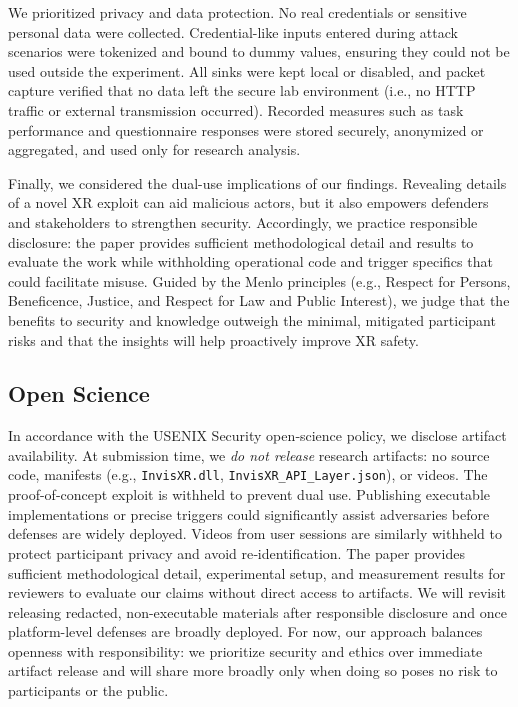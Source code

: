 \documentclass[letterpaper,twocolumn,10pt]{article}
\begin{document}
We prioritized privacy and data protection. No real credentials or sensitive personal data were collected. Credential-like inputs entered during attack scenarios were tokenized and bound to dummy values, ensuring they could not be used outside the experiment. All sinks were kept local or disabled, and packet capture verified that no data left the secure lab environment (i.e., no HTTP traffic or external transmission occurred). Recorded measures such as task performance and questionnaire responses were stored securely, anonymized or aggregated, and used only for research analysis.

Finally, we considered the dual-use implications of our findings. Revealing details of a novel XR exploit can aid malicious actors, but it also empowers defenders and stakeholders to strengthen security. 
Accordingly, we practice responsible disclosure: the paper provides sufficient methodological detail and results to evaluate the work while withholding operational code and trigger specifics that could facilitate misuse. Guided by the Menlo principles (e.g., Respect for Persons, Beneficence, Justice, and Respect for Law and Public Interest), we judge that the benefits to security and knowledge outweigh the minimal, mitigated participant risks and that the insights will help proactively improve XR safety.

\subsection{Open Science}
\label{app:openscience}
In accordance with the USENIX Security open‑science policy, we disclose artifact availability. At submission time, we \emph{do not release} research artifacts: no source code, manifests (e.g., \texttt{InvisXR.dll}, \texttt{InvisXR\_API\_Layer.json}), or videos. The proof-of-concept exploit is withheld to prevent dual use. Publishing executable implementations or precise triggers could significantly assist adversaries before defenses are widely deployed. Videos from user sessions are similarly withheld to protect participant privacy and avoid re‑identification. The paper provides sufficient methodological detail, experimental setup, and measurement results for reviewers to evaluate our claims without direct access to artifacts. We will revisit releasing redacted, non-executable materials after responsible disclosure and once platform-level defenses are broadly deployed. For now, our approach balances openness with responsibility: we prioritize security and ethics over immediate artifact release and will share more broadly only when doing so poses no risk to participants or the public.
\end{document}
